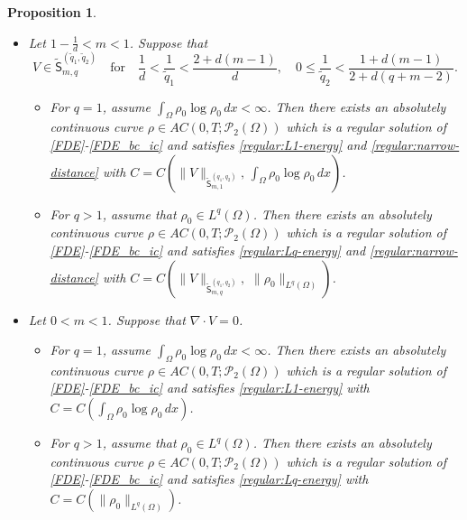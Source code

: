 \documentclass{amsart}
\newtheorem{proposition}[defn]{Proposition}
\numberwithin{equation}{section}
\begin{document}
\begin{proposition}
\begin{itemize}
\begin{itemize}
      \end{itemize}
	
	\item [(ii)] Let  $1-\frac{1}{d} < m < 1$. Suppose that
	\begin{equation}\label{V:tilde:Lq-regular}
V\in \tilde{\mathsf{S}}_{m,q}^{(\tilde{q}_1, \tilde{q}_2)} \quad  \text{for} \quad  \frac{1}{d} < \frac{1}{\tilde{q}_1} < \frac{2+ d(m-1)}{d}, \quad  0 \leq \frac{1}{\tilde{q}_2} < \frac{1+d(m-1)}{2+d(q+m-2)}. 	 
\end{equation} 
    \begin{itemize}
      \item[$\bullet$] For $q=1$, assume $\int_{\Omega} \rho_0 \log \rho_0 \,dx < \infty$. Then there exists an absolutely continuous curve ${\rho}\in
AC(0,T;\mathcal{P}_2(\Omega))$ which is a regular solution of \eqref{FDE}-\eqref{FDE_bc_ic} and satisfies \eqref{regular:L1-energy} 	
      and \eqref{regular:narrow-distance} with $C=C (\|V\|_{\tilde{\mathsf{S}}_{m,1}^{(q_1, q_2)}}, \, \int_{\Omega} \rho_0 \log \rho_0 \,dx )$.

\item[$\bullet$] For $q>1$, assume that $\rho_0 \in L^q (\Omega)$. Then there exists an absolutely continuous curve ${\rho}\in
AC(0,T;\mathcal{P}_2(\Omega))$ which is a regular solution of \eqref{FDE}-\eqref{FDE_bc_ic} and satisfies \eqref{regular:Lq-energy} 	
      and \eqref{regular:narrow-distance} with $C=C (\|V\|_{\tilde{\mathsf{S}}_{m,q}^{(q_1, q_2)}}, \, \, \|\rho_{0}\|_{L^{q} (\Omega)} )$.
    \end{itemize}

	\item [(iii)] Let $0<m<1$. Suppose that $\nabla \cdot V =0$. 
 \begin{itemize}
      \item[$\bullet$] For $q=1$, assume $\int_{\Omega} \rho_0 \log \rho_0 \,dx < \infty$. Then there exists an absolutely continuous curve ${\rho}\in
AC(0,T;\mathcal{P}_2(\Omega))$ which is a regular solution of \eqref{FDE}-\eqref{FDE_bc_ic} and satisfies \eqref{regular:L1-energy} with  	$C=C(\int_{\Omega} \rho_0 \log \rho_0 \,dx )$.

\item[$\bullet$] For $q>1$, assume that $\rho_0 \in L^q (\Omega)$. Then there exists an absolutely continuous curve ${\rho}\in
AC(0,T;\mathcal{P}_2(\Omega))$ which is a regular solution of \eqref{FDE}-\eqref{FDE_bc_ic} and satisfies \eqref{regular:Lq-energy} 	
     with $C=C (\|\rho_{0}\|_{L^{q} (\Omega)} )$.



\end{itemize}
\end{itemize}
\end{proposition}
\end{document}
